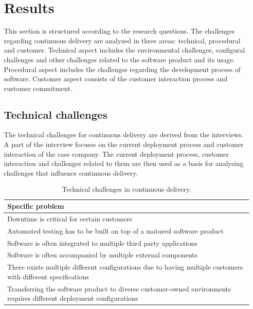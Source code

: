 \documentclass[lnbip]{svmultln}
\begin{document}
\section{Results}

This section is structured according to the research questions. The challenges regarding continuous delivery are analyzed in three areas: technical, procedural and customer. Technical aspect includes the environmental challenges, configural challenges and other challenges related to the software product and its usage. Procedural aspect includes the challenges regarding the development process of software. Customer aspect consists of the customer interaction process and customer commitment.

\subsection{Technical challenges}
The technical challenges for continuous delivery are derived from the interviews. A part of the interview focuses on the current deployment process and customer interaction of the case company. The current deployment process, customer interaction and challenges related to them are then used as a basis for analysing challenges that influence continuous delivery. 

\begin{table}[htb]
    \begin{tabular}{ | p{12cm} |}
    \hline
    \textbf{Specific problem} \\ \hline
    Downtime is critical for certain customers \\ \hline
    Automated testing has to be built on top of a matured software product \\ \hline
    Software is often integrated to multiple third party applications \\ \hline
    Software is often accompanied by multiple external components \\ \hline
    There exists multiple different configurations due to having multiple customers with different specifications \\ \hline
    Transferring the software product to diverse customer-owned environments requires different deployment configurations \\ 
    \hline
    \end{tabular}
    \caption{Technical challenges in continuous delivery.}
    \end{table}
\end{document}
